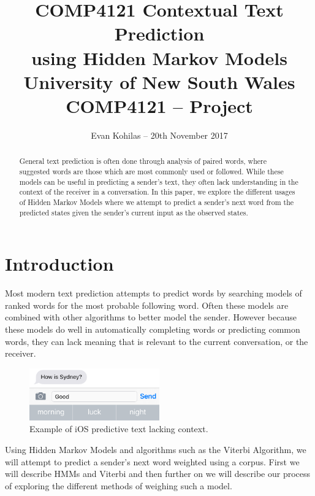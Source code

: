 \documentclass{article}
\title{COMP4121}
\begin{document}
\title{
    {\textbf{Contextual Text Prediction\\using Hidden Markov Models}}\\
    {University of New South Wales}\\
    {COMP4121 -- Project}
}
\author{Evan Kohilas -- 20th November 2017}
\date{}
\maketitle

\begin{abstract}
    General text prediction is often done through analysis of paired words,
    where suggested words are those which are most commonly used or followed.
    While these models can be useful in predicting a sender's text, they often
    lack understanding in the context of the receiver in a conversation. In this
    paper, we explore the different usages of Hidden Markov Models where we
    attempt to predict a sender's next word from the predicted states given the
    sender's current input as the observed states.
\end{abstract}

\section{Introduction}
Most modern text prediction attempts to predict words by searching models of
ranked words for the most probable following word. Often these models are
combined with other algorithms to better model the sender. However because these
models do well in automatically completing words or predicting common words,
they can lack meaning that is relevant to the current conversation, or the
receiver.

\begin{figure}[H]
    \centering
    \includegraphics[width=0.5\textwidth]{sydney.png}
    \caption{Example of iOS predictive text lacking context.}
\end{figure}

Using Hidden Markov Models and algorithms such as the Viterbi Algorithm,
we will attempt to predict a sender's next word weighted using a corpus.
First we will describe HMMs and Viterbi and then further on we will describe our
process of exploring the different methods of weighing such a model.
\end{document}
